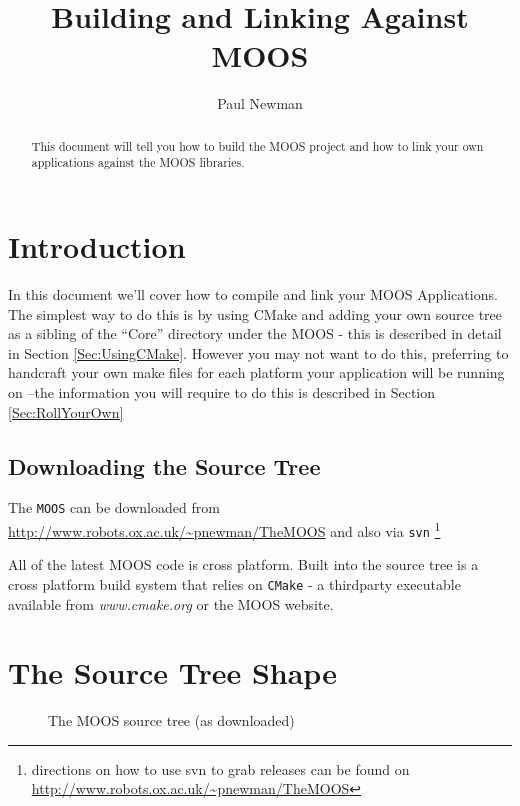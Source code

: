 \documentclass[a4paper,10pt]{article}
\title{Building and Linking Against MOOS}
\author{Paul Newman}
\newcommand{\Code}[1]{\texttt{#1} }
\newcommand{\code}[1]{\Code{#1} }
\begin{document}
\maketitle

\begin{center}
\end{center}
\begin{abstract}
This document will tell you how to build the MOOS project and how to link your own
applications against the MOOS libraries.
\end{abstract}





\section{Introduction}\label{Sec:CompilingAndLinking}
In this document we'll cover how to compile and link your MOOS Applications.
The simplest way to do this is by using CMake and adding your own source tree as a sibling of the ``Core'' directory
under the MOOS - this is described in detail in Section \ref{Sec:UsingCMake}. However you may not want to do this,
preferring to handcraft your own make files for each platform your application will be running on --the information you will require to do this is described in Section \ref{Sec:RollYourOwn}

\subsection{Downloading the Source Tree}

The \code{MOOS} can  be downloaded from \url{http://www.robots.ox.ac.uk/~pnewman/TheMOOS} and also via \code{svn}\footnote{directions on how to use svn to grab releases can be found on \url{http://www.robots.ox.ac.uk/~pnewman/TheMOOS}}

All of the latest MOOS code is cross platform. Built into
the source tree is a cross platform build system that relies on
\code{CMake} - a thirdparty executable available from
{\it{www.cmake.org}} or the MOOS website.

\section{The Source Tree Shape}

\begin{figure}[ht!]\label{Fig:MOOSTree}
\centering {}
\caption{The MOOS source tree (as downloaded)}
\end{figure}
\end{document}
